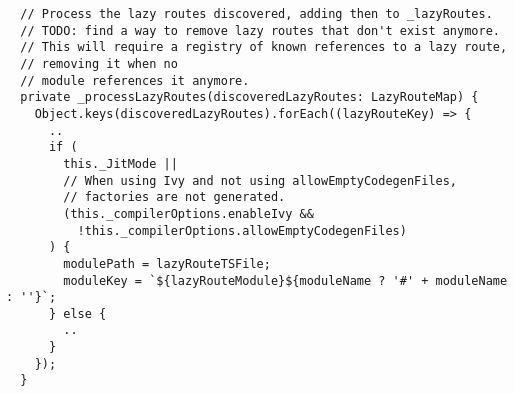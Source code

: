 \begin{verbatim}
  // Process the lazy routes discovered, adding then to _lazyRoutes.
  // TODO: find a way to remove lazy routes that don't exist anymore.
  // This will require a registry of known references to a lazy route,
  // removing it when no
  // module references it anymore.
  private _processLazyRoutes(discoveredLazyRoutes: LazyRouteMap) {
    Object.keys(discoveredLazyRoutes).forEach((lazyRouteKey) => {
      ..
      if (
        this._JitMode ||
        // When using Ivy and not using allowEmptyCodegenFiles,
        // factories are not generated.
        (this._compilerOptions.enableIvy &&
          !this._compilerOptions.allowEmptyCodegenFiles)
      ) {
        modulePath = lazyRouteTSFile;
        moduleKey = `${lazyRouteModule}${moduleName ? '#' + moduleName : ''}`;
      } else {
        ..
      }
    });
  }
\end{verbatim}
